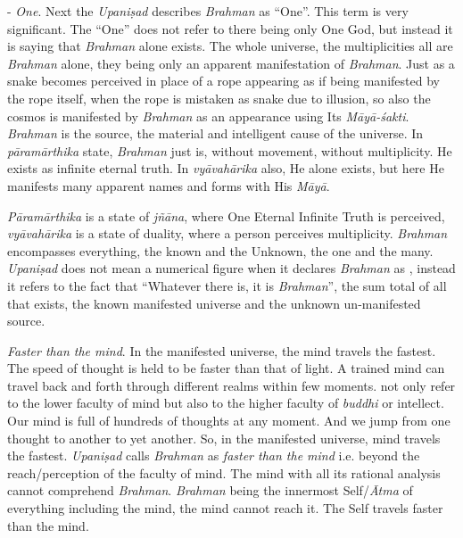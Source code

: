- \emph{One}. Next the \emph{Upaniṣad} describes \emph{Brahman} as ``One''. This term is very significant. The ``One'' does not refer to there being only One God, but instead it is saying that \emph{Brahman} alone exists. The whole universe, the multiplicities all are \emph{Brahman} alone, they being only an apparent manifestation of \emph{Brahman}. Just as a snake becomes perceived in place of a rope appearing as if being manifested by the rope itself, when the rope is mistaken as snake due to illusion, so also the cosmos is manifested by \emph{Brahman} as an appearance using Its \emph{Māyā-śakti}. \emph{Brahman} is the source, the material and intelligent cause of the universe. In \emph{pāramārthika} state, \emph{Brahman} just is, without movement, without multiplicity. He exists as infinite eternal truth. In \emph{vyāvahārika} also, He alone exists, but here He manifests many apparent names and forms with His \emph{Māyā}.

\emph{Pāramārthika} is a state of \emph{jñāna}, where One Eternal Infinite Truth is perceived, \emph{vyāvahārika} is a state of duality, where a person perceives multiplicity. \emph{Brahman} encompasses everything, the known and the Unknown, the one and the many. \emph{Upaniṣad} does not mean a numerical figure when it declares \emph{Brahman} as , instead it refers to the fact that ``Whatever there is, it is \emph{Brahman}'', the sum total of all that exists, the known manifested universe and the unknown un-manifested source.

 \emph{Faster than the mind}. In the manifested universe, the mind travels the fastest. The speed of thought is held to be faster than that of light. A trained mind can travel back and forth through different realms within few moments.  not only refer to the lower faculty of mind but also to the higher faculty of \emph{buddhi} or intellect. Our mind is full of hundreds of thoughts at any moment. And we jump from one thought to another to yet another. So, in the manifested universe, mind travels the fastest. \emph{Upaniṣad} calls \emph{Brahman} as \emph{faster than the mind} i.e. beyond the reach/perception of the faculty of mind. The mind with all its rational analysis cannot comprehend \emph{Brahman}. \emph{Brahman} being the innermost Self/\emph{Ātma} of everything including the mind, the mind cannot reach it. The Self travels faster than the mind.

